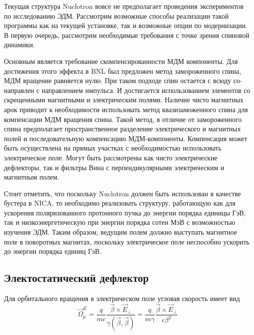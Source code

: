 \par Текущая структура Nuclotron вовсе не предполагает проведения экспериментов по исследованию ЭДМ. Рассмотрим возможные способы реализации такой программы как на текущей установке, так и возможные опции по модернизации. В первую очередь, рассмотрим необходимые требования с точке зрения спиновой динамики.

Основным является требование скомпенсированности МДМ компоненты. Для достижения этого эффекта в BNL был предложен метод замороженного спина, МДМ вращение равняется нулю. При таком подходе спин остается с всюду со-направлен с направлением импульса. И достигается использованием элементов со скрещенными магнитными и электрическим полями. 
Наличие чисто магнитных арок приводит к необходимости использовать метод квазизаможенного спина для компенсации МДМ вращения спина. Такой метод, в отличие от замороженного спина предполагает пространственное разделение электрического и магнитных полей и последовательную компенсацию МДМ-компоненты. Компенсация может быть осуществлена на прямых участках с необходимостью использовать электрическое поле. Могут быть рассмотрены как чисто электрические дефлекторы, так и фильтры Вина с перпендикулярными электрическим и магнитным полем.

Стоит отметить, что поскольку Nuclotron должен быть использован в качестве бустера в NICA, то необходимо реализовать структуру, работающую как для ускорения поляризованного протонного пучка до энергии порядка единицы ГэВ, так и низкоэнергетическую при энергии порядка сотен МэВ с возможностью изучения ЭДМ. Таким образом, ведущим полем должно выступать магнитное поле в поворотных магнитах, поскольку электрическое поле неспособно ускорить до энергии порядка единиц ГэВ. 

	\subsection{Электостатический дефлектор}\label{sec:EDM/requirements/deflector}
	
	
\par Для орбитального вращения в электрическом поле угловая скорость имеет вид
\begin{equation}
\vec{\Omega}_p^E=\frac{q}{m c} \frac{\vec{\beta} \times \vec{E}_{\perp}}{\gamma(\vec{\beta}, \vec{\beta})}=\frac{q}{m \gamma} \frac{\vec{\beta} \times \vec{E}_{\perp}}{c \beta^2}
\end{equation}

